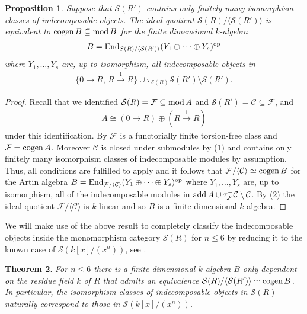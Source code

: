 \documentclass[a4paper]{amsart}
\newcommand{\op}{\textnormal{op}}
\renewcommand{\mod}{\textnormal{mod}\,}
\newcommand{\add}{\textnormal{add}\,}
\newcommand{\cogen}{\textnormal{cogen}\,}
\numberwithin{equation}{section} \theoremstyle{plain}
\newtheorem{thm}{Theorem}
\numberwithin{thm}{section}
\newtheorem{prop}[thm]{Proposition}
\begin{document}
\begin{prop}\label{P: key} Suppose that $\mathcal{S}(R')$ contains only finitely many isomorphism classes of indecomposable objects. The ideal quotient $\mathcal{S}(R)/\langle \mathcal{S}(R')\rangle$ is equivalent to $\cogen B \subseteq \mod B$ for the finite dimensional $k$-algebra 
\begin{align*}
B = \mathrm{End}_{\mathcal{S}(R)/\langle \mathcal{S}(R') \rangle}(Y_1\oplus  \dots \oplus Y_s)^\op    
\end{align*}
where $Y_1, \dots, Y_s$ are, up to isomorphism, all indecomposable objects in
\begin{align*}
\{ 0\to R,\,R\xrightarrow{1} R\} \cup \tau_{\mathcal{S}(R)}^- \mathcal{S}(R') \setminus \mathcal{S}(R').
\end{align*}
\end{prop}
\begin{proof} Recall that we identified $\mathcal{S}(R) = \mathcal{F} \subseteq \mod A$ and $\mathcal{S}(R') = \mathcal{C} \subseteq \mathcal{F}$, and
\begin{align*}
A \cong (0\to R) \oplus (R \xrightarrow{1} R )   
\end{align*}
under this identification. By  $\mathcal{F}$ is a functorially finite torsion-free class and $\mathcal{F} = \cogen A$. Moreover $\mathcal{C}$ is closed under submodules by  (1) and contains only finitely many isomorphism classes of indecomposable modules by assumption. Thus, all conditions are fulfilled to apply  and it follows that $\mathcal{F}/\langle \mathcal{C} \rangle \simeq \cogen B$ for the Artin algebra $B = \mathrm{End}_{\mathcal{F}/\langle \mathcal{C} \rangle} (Y_1\oplus \dots \oplus Y_s)^\op$ where $Y_1, \dots, Y_s$ are, up to isomorphism, all of the indecomposable modules in $\add A \cup \tau_\mathcal{F}^-\mathcal{C} \setminus \mathcal{C}$. By  (2) the ideal quotient $\mathcal{F}/ \langle \mathcal{C} \rangle$ is $k$-linear and so $B$ is a finite dimensional $k$-algebra.
\end{proof}

We will make use of the above result to completely classify the indecomposable objects inside the monomorphism category $\mathcal{S}(R)$ for $n \leq 6$ by reducing it to the known case of $\mathcal{S}(k[x]/(x^n))$, see .

\begin{thm}\label{T: main indep} For $n \leq 6$ there is a finite dimensional $k$-algebra $B$ only dependent on the residue field $k$ of $R$ that admits an equivalence $\mathcal{S}(R)/\langle \mathcal{S}(R') \rangle \simeq \cogen B$. In particular, the isomorphism classes of indecomposable objects in $\mathcal{S}(R)$ naturally correspond to those in $\mathcal{S}(k[x]/(x^n))$. 
\end{thm}
\end{document}
